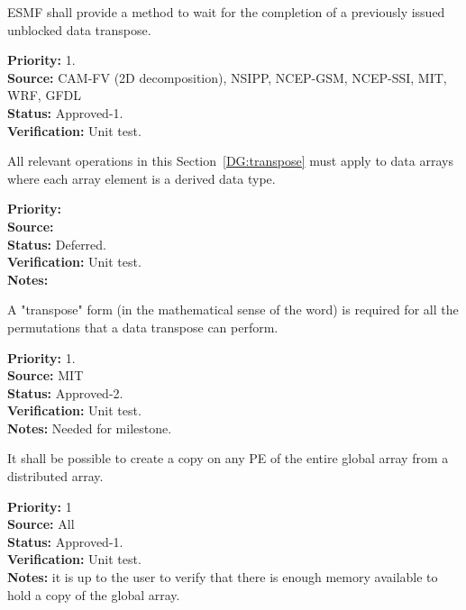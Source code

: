 
ESMF shall provide a method to wait for the completion of a previously
issued unblocked data transpose.

\begin{reqlist}
{\bf Priority:} 1. \\ 
{\bf Source:} CAM-FV (2D decomposition), NSIPP, NCEP-GSM, NCEP-SSI, MIT, WRF, GFDL \\
{\bf Status:} Approved-1. \\
{\bf Verification:} Unit test.
\end{reqlist}


All relevant operations in this Section~\ref{DG:transpose} must apply to
data arrays where each array element is a derived data type.

\begin{reqlist}
{\bf Priority:} \\
{\bf Source:} \\
{\bf Status:} Deferred. \\
{\bf Verification:} Unit test.\\
{\bf Notes:}
\end{reqlist}

A "transpose" form (in the mathematical sense of the word) is required
for all the permutations that a data transpose can perform.
\begin{reqlist}
{\bf Priority:} 1. \\ 
{\bf Source:}  MIT \\
{\bf Status:} Approved-2. \\
{\bf Verification:} Unit test. \\
{\bf Notes:} Needed for milestone.
\end{reqlist}


It shall be possible to create a copy on any PE of the entire global
array from a distributed array.

\begin{reqlist}
{\bf Priority:} 1 \\  
{\bf Source:} All \\
{\bf Status:} Approved-1. \\
{\bf Verification:} Unit test. \\
{\bf Notes:} it is up to the user to verify that there is enough
memory available to hold a copy of the global array.
\end{reqlist}


